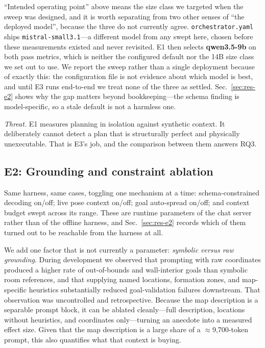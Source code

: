 \documentclass[10pt,twocolumn]{article}
\newcommand{\code}[1]{\texttt{\small #1}}
\begin{document}
``Intended operating point'' above means the size class we targeted when the
sweep was designed, and it is worth separating from two other senses of
``the deployed model'', because the three do not currently agree.
\code{orchestrator.yaml} ships \code{mistral-small3.1}---a different model from
any swept here, chosen before these measurements existed and never revisited.
E1 then selects \textbf{qwen3.5-9b} on both pass metrics, which is neither the
configured default nor the 14B size class we set out to use. We report the
sweep rather than a single deployment because of exactly this: the
configuration file is not evidence about which model is best, and until E3 runs
end-to-end we treat none of the three as settled. Sec.~\ref{sec:res-e2} shows
why the gap matters beyond bookkeeping---the schema finding is model-specific,
so a stale default is not a harmless one.

\emph{Threat.} E1 measures planning in isolation against synthetic context. It
deliberately cannot detect a plan that is structurally perfect and physically
unexecutable. That is E3's job, and the comparison between them answers RQ3.

\subsection{E2: Grounding and constraint ablation}
\label{sec:e2}

Same harness, same cases, toggling one mechanism at a time:
schema-constrained decoding on/off; live pose context on/off; goal auto-spread
on/off; and context budget swept across its range. These are runtime
parameters of the chat server rather than of the offline harness, and
Sec.~\ref{sec:res-e2} records which of them turned out to be reachable from
the harness at all.

We add one factor that is not currently a parameter: \emph{symbolic versus raw
grounding}. During development we observed that prompting with raw coordinates
produced a higher rate of out-of-bounds and wall-interior goals than symbolic
room references, and that supplying named locations, formation zones, and
map-specific heuristics substantially reduced goal-validation failures
downstream. That observation was uncontrolled and
retrospective. Because the map description is a separable prompt block, it can
be ablated cleanly---full description, locations without heuristics, and
coordinates only---turning an anecdote into a measured effect size. Given that
the map description is a large share of a $\approx$9{,}700-token prompt, this
also quantifies what that context is buying.
\end{document}
